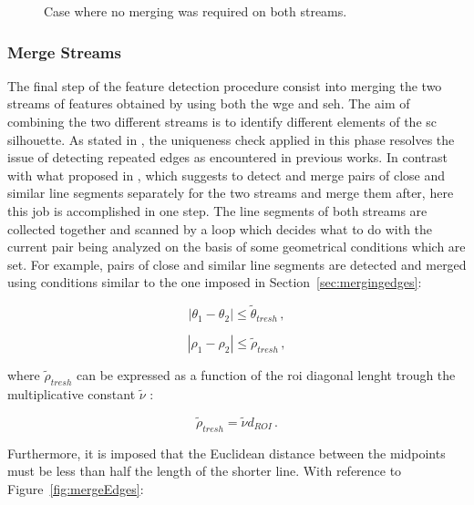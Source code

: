\begin{figure}[htbp]
  \centering
  \qquad
  \qquad
  \caption{Case where no merging was required on both streams.}
  \label{fig:resultsMergingEdge3}
\end{figure}

\subsubsection{Merge Streams}
The final step of  the feature detection procedure consist into merging the two streams of features obtained by using both the \acrshort{wge} and \acrshort{seh}. The aim of combining the two different streams is to identify different elements of the \acrshort{sc} silhouette. As stated in \cite{Sharma2018}, the uniqueness check applied in this phase resolves the issue of detecting repeated edges as encountered in previous works.
In contrast with what proposed in \cite{Sharma2018}, which suggests to detect and merge pairs of close and similar line segments separately for the two streams and merge them after, here this job is accomplished in one step. The line segments of both streams are collected together and scanned by a loop which decides what to do with the current pair being analyzed on the basis of some geometrical conditions which are set.
For example, pairs of close and similar line segments are detected and merged using conditions similar to the one imposed in Section~\ref{sec:mergingedges}:

\begin{equation}
  |\theta_1 - \theta_2| \leqslant \tilde{\theta}_{tresh} \,,
\end{equation}

\begin{equation}
  |\rho_1 - \rho_2| \leqslant \tilde{\rho}_{tresh} \,,
\end{equation}

where $\tilde{\rho}_{tresh}$ can be expressed as a function of the \acrshort{roi} diagonal lenght trough the multiplicative constant $\tilde{\nu}$ \cite{fracchio2019}:

\begin{equation}
  \tilde{\rho}_{tresh} = \tilde{\nu} d_{ROI} \,.
\end{equation}

Furthermore, it is imposed that the Euclidean distance between the midpoints must be less than half the length of the shorter line. With reference to Figure~\ref{fig:mergeEdges}:

